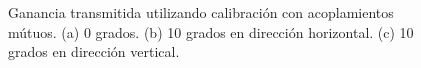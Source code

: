 \begin{figure}[H]
	\centering
 	
		\caption{Ganancia transmitida utilizando calibración con acoplamientos mútuos. (a) 0 grados. (b) 10 grados en 
		dirección horizontal. (c) 10 grados en dirección vertical.}
	\label{fig:chirpErrMutual}
\end{figure}
